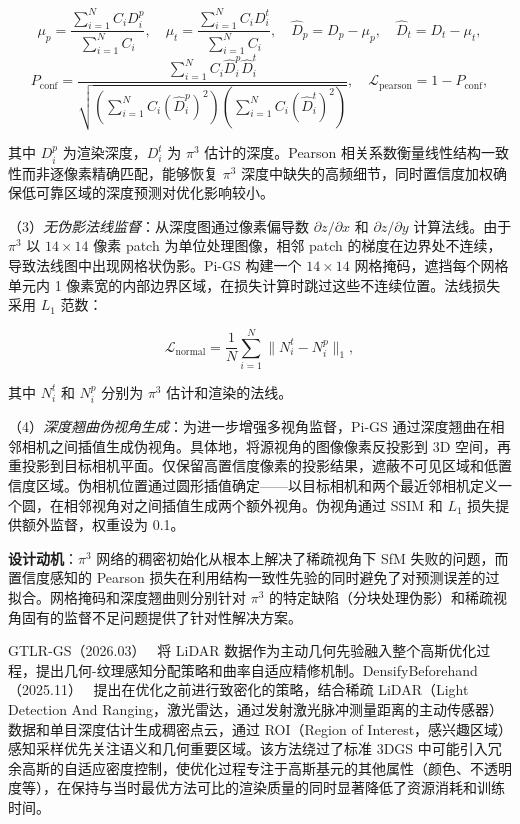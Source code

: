 \begin{equation*}
\mu_p = \frac{\sum_{i=1}^{N} C_i D^p_i}{\sum_{i=1}^{N} C_i}, \quad \mu_t = \frac{\sum_{i=1}^{N} C_i D^t_i}{\sum_{i=1}^{N} C_i}, \quad \hat{D}_p = D_p - \mu_p, \quad \hat{D}_t = D_t - \mu_t,
\end{equation*}
\begin{equation*}
P_{\mathrm{conf}} = \frac{\sum_{i=1}^{N} C_i \hat{D}^p_i \hat{D}^t_i}{\sqrt{(\sum_{i=1}^{N} C_i (\hat{D}^p_i)^2)(\sum_{i=1}^{N} C_i (\hat{D}^t_i)^2)}}, \quad \mathcal{L}_{\mathrm{pearson}} = 1 - P_{\mathrm{conf}},
\end{equation*}

其中 $D^p_i$ 为渲染深度，$D^t_i$ 为 $\pi^3$ 估计的深度。Pearson 相关系数衡量线性结构一致性而非逐像素精确匹配，能够恢复 $\pi^3$ 深度中缺失的高频细节，同时置信度加权确保低可靠区域的深度预测对优化影响较小。

（3）\textit{无伪影法线监督}：从深度图通过像素偏导数 $\partial z / \partial x$ 和 $\partial z / \partial y$ 计算法线。由于 $\pi^3$ 以 $14 \times 14$ 像素 patch 为单位处理图像，相邻 patch 的梯度在边界处不连续，导致法线图中出现网格状伪影。Pi-GS 构建一个 $14 \times 14$ 网格掩码，遮挡每个网格单元内 1 像素宽的内部边界区域，在损失计算时跳过这些不连续位置。法线损失采用 $L_1$ 范数：

\begin{equation*}
\mathcal{L}_{\mathrm{normal}} = \frac{1}{N} \sum_{i=1}^{N} \| N^t_i - N^p_i \|_1,
\end{equation*}

其中 $N^t_i$ 和 $N^p_i$ 分别为 $\pi^3$ 估计和渲染的法线。

（4）\textit{深度翘曲伪视角生成}：为进一步增强多视角监督，Pi-GS 通过深度翘曲在相邻相机之间插值生成伪视角。具体地，将源视角的图像像素反投影到 3D 空间，再重投影到目标相机平面。仅保留高置信度像素的投影结果，遮蔽不可见区域和低置信度区域。伪相机位置通过圆形插值确定——以目标相机和两个最近邻相机定义一个圆，在相邻视角对之间插值生成两个额外视角。伪视角通过 SSIM 和 $L_1$ 损失提供额外监督，权重设为 0.1。

\textbf{设计动机}：$\pi^3$ 网络的稠密初始化从根本上解决了稀疏视角下 SfM 失败的问题，而置信度感知的 Pearson 损失在利用结构一致性先验的同时避免了对预测误差的过拟合。网格掩码和深度翘曲则分别针对 $\pi^3$ 的特定缺陷（分块处理伪影）和稀疏视角固有的监督不足问题提供了针对性解决方案。

GTLR-GS（2026.03）~\cite{2603_23192} 将 LiDAR 数据作为主动几何先验融入整个高斯优化过程，提出几何-纹理感知分配策略和曲率自适应精修机制。DensifyBeforehand（2025.11）~\cite{2511_19294} 提出在优化之前进行致密化的策略，结合稀疏 LiDAR（Light Detection And Ranging，激光雷达，通过发射激光脉冲测量距离的主动传感器）数据和单目深度估计生成稠密点云，通过 ROI（Region of Interest，感兴趣区域）感知采样优先关注语义和几何重要区域。该方法绕过了标准 3DGS 中可能引入冗余高斯的自适应密度控制，使优化过程专注于高斯基元的其他属性（颜色、不透明度等），在保持与当时最优方法可比的渲染质量的同时显著降低了资源消耗和训练时间。

